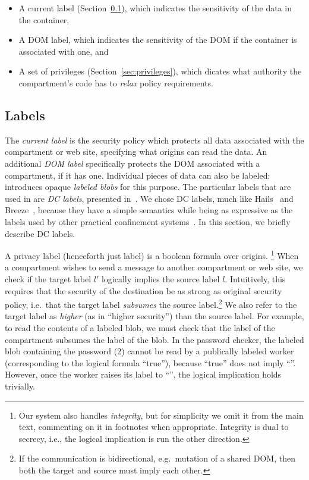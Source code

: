 \begin{itemize}
    \item A current label (Section~\ref{sec:labels}), which indicates the
        sensitivity of the data in the container,
    \item A DOM label, which indicates the sensitivity of the DOM if the
        container is associated with one, and
    \item A set of privileges (Section~\ref{sec:privileges}), which
        dicates what authority the compartment's code has to
        \emph{relax} policy requirements.
\end{itemize}

\subsection{Labels}
\label{sec:labels}

The \emph{current label} is the security policy which protects all data associated with the compartment or
web site, specifying what origins can read the data.
%
An additional \emph{DOM label} specifically protects the DOM associated
with a compartment, if it has one.
%
Individual pieces of data can also be labeled: \sys{}
introduces opaque \emph{labeled blobs} for this purpose.
%
The particular labels that are used in \sys{} are \emph{DC labels},
presented in~\cite{stefan:2011:dclabels}.
%
We chose DC labels, much like Hails~\cite{giffin:2012:hails} and
Breeze~\cite{Breeze13}, because they have a simple
semantics while being as expressive as the labels used by other practical
confinement systems~\cite{GenLabels}.
%
In this section, we briefly describe DC labels. %

A privacy label (henceforth just label) is a boolean formula over
origins.%
%
\footnote{
  Our system also handles \emph{integrity}, but for simplicity we
  omit it from the main text, commenting on it in footnotes when
  appropriate.  Integrity is dual to secrecy, i.e., the logical
  implication is run the other direction.
}
%
When a compartment wishes to send a message to another compartment or
web site, we check if the target label $l'$ logically implies the source
label $l$.
%
Intuitively, this requires that the security of the destination be as strong as original security policy, i.e.\ that the target label \emph{subsumes} the source label.\footnote{If the communication is bidirectional, e.g.\ mutation of a shared DOM, then both the target and source must imply each other.}
%
We also refer to the target label as \emph{higher} (as in ``higher security'') than the source label.
%
For example, to read the contents of a labeled blob, we must check that
the label of the compartment subsumes the label of the blob.
%
In the password checker, the labeled blob containing the password (2)
cannot be read by a publically labeled worker (corresponding to the
logical formula ``true''), because ``true'' does not imply
``''.
%
However, once the worker raises its label to ``'', the
logical implication holds trivially.

